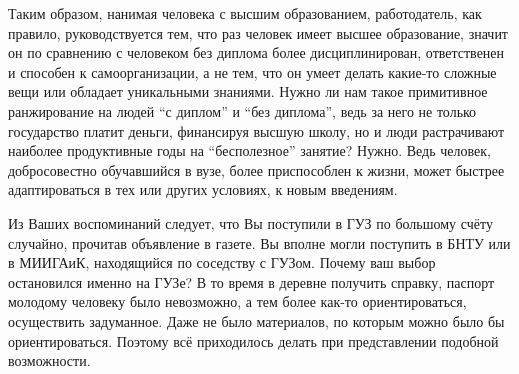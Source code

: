 \begin{drama}
Таким образом, нанимая человека с высшим образованием, работодатель, как правило, руководствуется тем, что раз человек имеет высшее образование, значит он по сравнению с человеком без диплома более дисциплинирован, ответственен и способен к самоорганизации, а не тем, что он умеет делать какие-то сложные вещи или обладает уникальными знаниями. Нужно ли нам такое примитивное ранжирование на людей “с диплом” и “без диплома”, ведь за него не только государство платит деньги, финансируя высшую школу, но и люди растрачивают наиболее продуктивные годы на “бесполезное” занятие?
	\michaelspeaks Нужно. Ведь человек, добросовестно обучавшийся в вузе, более приспособлен к жизни, может быстрее адаптироваться в тех или других условиях, к новым введениям.	
	
	\maxspeaks Из Ваших воспоминаний следует, что Вы поступили в ГУЗ по большому счёту случайно, прочитав объявление в газете. Вы вполне могли поступить в БНТУ или в МИИГАиК, находящийся по соседству с ГУЗом. Почему ваш выбор остановился именно на ГУЗе?
	\michaelspeaks В то время в деревне получить справку, паспорт молодому человеку было невозможно, а тем более как-то ориентироваться, осуществить задуманное. Даже не было материалов, по которым можно было бы ориентироваться. Поэтому всё приходилось делать при представлении подобной возможности.


\end{drama}
